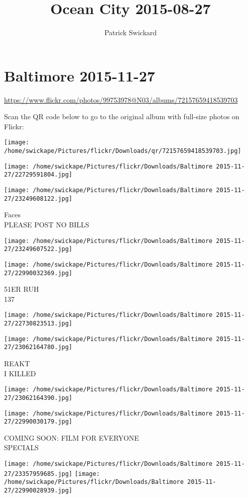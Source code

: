 \documentclass[10pt,letterpaper]{article}
\title{Ocean City 2015-08-27}
\author{Patrick Swickard}
\date{}
\begin{document}
\section*{Baltimore 2015-11-27}

\url{https://www.flickr.com/photos/99753978@N03/albums/72157659418539703}

Scan the QR code below to go to the original album with full-size photos on Flickr:

\texttt{[image: /home/swickape/Pictures/flickr/Downloads/qr/72157659418539703.jpg]}
\pagebreak

\texttt{[image: /home/swickape/Pictures/flickr/Downloads/Baltimore 2015-11-27/22729591804.jpg]}

\vspace{0.25in}
\texttt{[image: /home/swickape/Pictures/flickr/Downloads/Baltimore 2015-11-27/23249608122.jpg]}

Faces\\
PLEASE POST NO BILLS
\pagebreak

\texttt{[image: /home/swickape/Pictures/flickr/Downloads/Baltimore 2015-11-27/23249607522.jpg]}

\vspace{0.25in}
\texttt{[image: /home/swickape/Pictures/flickr/Downloads/Baltimore 2015-11-27/22990032369.jpg]}

51ER RUH\\
137
\pagebreak

\texttt{[image: /home/swickape/Pictures/flickr/Downloads/Baltimore 2015-11-27/22730823513.jpg]}

\vspace{0.25in}
\texttt{[image: /home/swickape/Pictures/flickr/Downloads/Baltimore 2015-11-27/23062164780.jpg]}

REAKT\\
I KILLED
\pagebreak

\texttt{[image: /home/swickape/Pictures/flickr/Downloads/Baltimore 2015-11-27/23062164390.jpg]}

\vspace{0.25in}
\texttt{[image: /home/swickape/Pictures/flickr/Downloads/Baltimore 2015-11-27/22990030179.jpg]}

COMING SOON: FILM FOR EVERYONE\\
SPECIALS
\pagebreak

\texttt{[image: /home/swickape/Pictures/flickr/Downloads/Baltimore 2015-11-27/23357959685.jpg]}
\texttt{[image: /home/swickape/Pictures/flickr/Downloads/Baltimore 2015-11-27/22990028939.jpg]}
\end{document}
